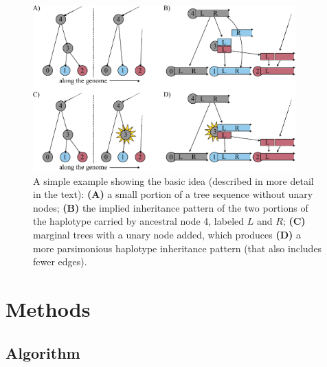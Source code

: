 \documentclass[10pt,twoside,lineno]{gsajnl}
\begin{document}
\begin{figure}
    \begin{center}
    \includegraphics[width=0.9\textwidth]{conceptual_figure}
    \end{center}
    \caption{
        A simple example showing the basic idea
        (described in more detail in the text):
        \textbf{(A)} a small portion of a tree sequence without unary nodes;
        \textbf{(B)} the implied inheritance pattern of the two portions of the haplotype carried by ancestral node 4,
        labeled $L$ and $R$;
        \textbf{(C)} marginal trees with a unary node added,
        which produces \textbf{(D)} a more parsimonious haplotype inheritance pattern
        (that also includes fewer edges).
        \label{fig:conceptual}
    }
\end{figure}

\section{Methods}

\subsection{Algorithm}

 
\end{document}
